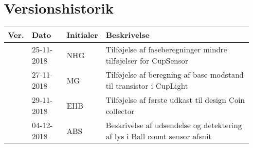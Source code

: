 \documentclass[HardwareDesign/HardwareDesign_main.tex]{subfiles}
\begin{document}
\section{Versionshistorik}
\begin{longtable}{|L{0.07\textwidth}|L{0.15\textwidth}|L{0.13\textwidth}|L{0.55\textwidth}|}
        \hline
        \textbf{Ver.} & \textbf{Dato} & \textbf{Initialer} & \textbf{Beskrivelse}  \\ \hline
         & 25-11-2018 & NHG & Tilføjelse af faseberegninger mindre tilføjelser for CupSensor \\ \hline
         & 27-11-2018 & MG & Tilføjelse af beregning af base modstand til transistor i CupLight \\ \hline
         & 29-11-2018 & EHB & Tilføjelse af første udkast til design Coin collector  \\ \hline
         & 04-12-2018 & ABS & Beskrivelse af udsendelse og detektering af lys i Ball count sensor afsnit \\ \hline
\end{longtable}
\end{document}
